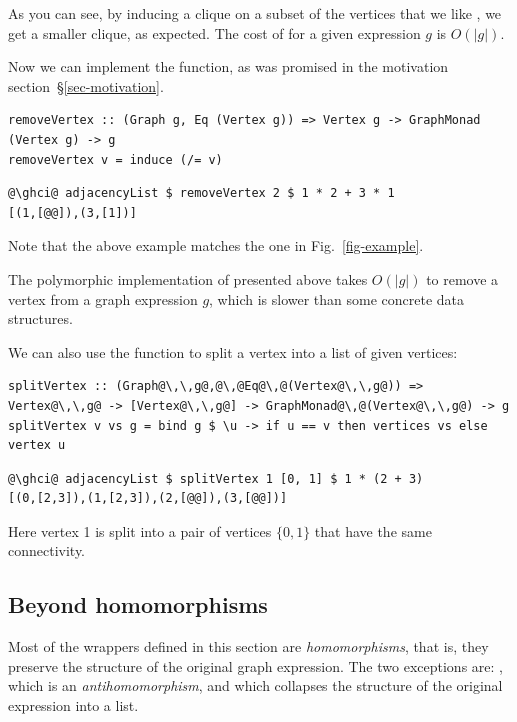 \noindent
As you can see, by inducing a clique on a subset of the vertices
that we like , we get a smaller clique, as expected.
The cost of  for a given expression $g$ is $O(|g|)$.

Now we can implement the  function, as
was promised in the motivation section~\S\ref{sec-motivation}.

\begin{verbatim}
removeVertex :: (Graph g, Eq (Vertex g)) => Vertex g -> GraphMonad (Vertex g) -> g
removeVertex v = induce (/= v)
\end{verbatim}
\vspace{1mm}
\begin{verbatim}
@\ghci@ adjacencyList $ removeVertex 2 $ 1 * 2 + 3 * 1
[(1,[@@]),(3,[1])]
\end{verbatim}

\noindent
Note that the above example matches the one in Fig.~\ref{fig-example}.

The polymorphic implementation of  presented above takes
$O(|g|)$ to remove a vertex from a graph expression $g$, which is
slower than some concrete data structures.

We can also use the  function to split a vertex into a list of given vertices:

\begin{verbatim}
splitVertex :: (Graph@\,\,g@,@\,@Eq@\,@(Vertex@\,\,g@)) => Vertex@\,\,g@ -> [Vertex@\,\,g@] -> GraphMonad@\,@(Vertex@\,\,g@) -> g
splitVertex v vs g = bind g $ \u -> if u == v then vertices vs else vertex u
\end{verbatim}
\vspace{1mm}
\begin{verbatim}
@\ghci@ adjacencyList $ splitVertex 1 [0, 1] $ 1 * (2 + 3)
[(0,[2,3]),(1,[2,3]),(2,[@@]),(3,[@@])]
\end{verbatim}

\noindent
Here vertex 1 is split into a pair of vertices $\{0, 1\}$ that have the same connectivity.

\subsection{Beyond homomorphisms}\label{sub-beyond}

Most of the  wrappers defined in this section are \emph{homomorphisms},
that is, they preserve the structure of the original graph expression. The two
exceptions are: , which is an \emph{antihomomorphism}, and
 which collapses the structure of the original expression into a list.

